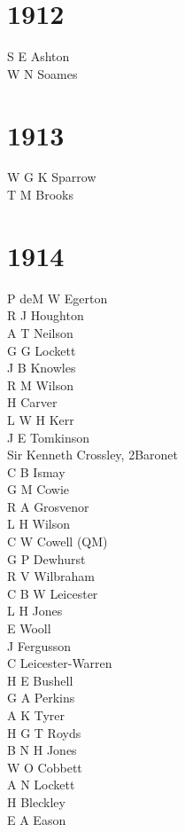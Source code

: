 \begin{multicols}{2}
  \section*{1912}
  S E Ashton \\
  W N Soames \\
  \section*{1913}
  W G K Sparrow \\
  T M Brooks \\
  \section*{1914}
  P deM W Egerton \\
  R J Houghton \\
  A T Neilson \\
  G G Lockett \\
  J B Knowles \\
  R M Wilson \\
  H Carver \\
  L W H Kerr \\
  J E Tomkinson \\
  Sir Kenneth Crossley, 2\nd Baronet \\
  C B Ismay \\
  G M Cowie \\
  R A Grosvenor \\
  L H Wilson \\
  C W Cowell (QM) \\
  G P Dewhurst \\
  R V Wilbraham \\
  C B W Leicester \\
  L H Jones \\
  E Wooll \\
  J Fergusson \\
  C Leicester-Warren \\
  H E Bushell \\
  G A Perkins \\
  A K Tyrer \\
  H G T Royds \\
  B N H Jones \\
  W O Cobbett \\
  A N Lockett \\
  H Bleckley \\
  E A Eason \\

\end{multicols}
